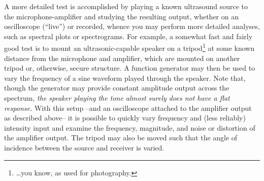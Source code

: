\documentclass[letterpaper]{article}
\begin{document}
A more detailed test is accomplished by playing a known ultrasound
source to the microphone-amplifier and studying the resulting output,
whether on an oscilloscope (``live'') or recorded, whence you may
perform more detailed analyses, such as spectral plots or
spectrograms. For example, a somewhat fast and fairly good test is to
mount an ultrasonic-capable speaker on a tripod\footnote{\ldots{}you
  know, as used for photography.} at some known distance from the
microphone and amplifier, which are mounted on another tripod or,
otherwise, secure structure. A function generator may then be used to
vary the frequency of a sine waveform played through the speaker. Note
that, though the generator may provide constant amplitude output
across the spectrum, \textit{the speaker playing the tone almost
  surely does not have a flat response.} With this setup --and an
oscilloscope attached to the amplifier output as described above-- it
is possible to quickly vary frequency and (less reliably) intensity
input and examine the frequency, magnitude, and noise or distortion of
the amplifier output. The tripod may also be moved such that the angle
of incidence between the source and receiver is varied.
\end{document}
